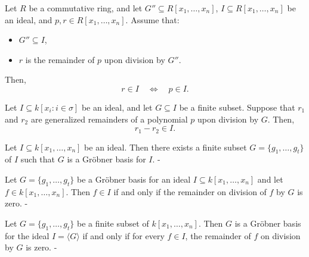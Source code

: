 \begin{lemma}\label{remainder_mem_ideal_iff}
  \leanok
  Let \( R \) be a commutative ring, and let \( G'' \subseteq R[x_1, \dots, x_n] \), \( I \subseteq R[x_1, \dots, x_n] \) be an ideal, and \( p, r \in R[x_1, \dots, x_n] \).
Assume that:
\begin{itemize}
\item \( G'' \subseteq I \),
\item \( r \) is the remainder of \( p \) upon division by \( G'' \).
\end{itemize}
Then,
\[
r \in I \quad \Longleftrightarrow \quad p \in I.
\]

\end{lemma}

\begin{lemma}\label{remainder_sub_remainder_mem_ideal}
  \leanok
  Let \( I \subseteq k[x_i : i \in \sigma] \) be an ideal, and let \( G \subseteq I \) be a finite subset.
Suppose that \( r_1 \) and \( r_2 \) are generalized remainders of a polynomial \( p \) upon division by \( G \).
Then,
\[
r_1 - r_2 \in I.
\]

\end{lemma}

\begin{lemma}\label{exists_groebner_basis}
  \leanok
  Let \( I \subseteq k[x_1, \ldots, x_n] \) be an ideal. Then there exists a finite subset \( G = \{g_1, \ldots, g_t\} \) of \( I \) such that \( G \) is a Gröbner basis for \( I \).
-
\end{lemma}

\begin{lemma}\label{groebner_basis_isRemainder_zero_iff_mem_span}

  Let \( G = \{g_1, \dots, g_t\} \) be a Gröbner basis for an ideal \( I \subseteq k[x_1, \dots, x_n] \) and let \( f \in k[x_1, \dots, x_n] \). Then \( f \in I \) if and only if the remainder on division of \( f \) by \( G \) is zero.
-
\end{lemma}

\begin{lemma}\label{is_groebner_basis_iff}

  Let \( G = \{g_1, \ldots, g_t\} \) be a finite subset of \( k[x_1, \ldots, x_n] \). Then \( G \) is a Gröbner basis for the ideal \( I = \langle G \rangle \) if and only if  for every \( f \in I \), the remainder of \( f \) on division by \( G \) is zero.
-
\end{lemma}

